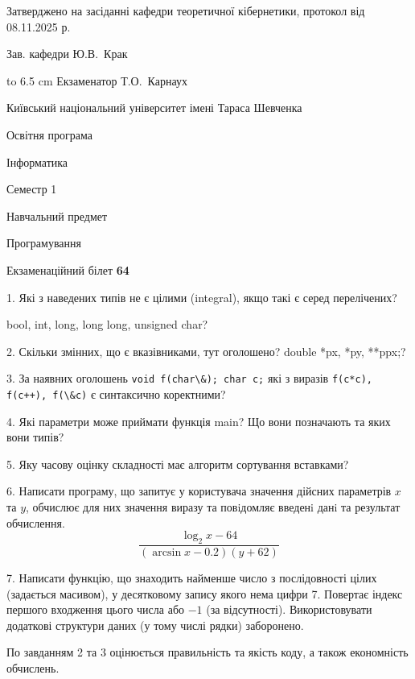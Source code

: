 \documentclass[12pt, ukrainian]{article}
\def\code#1{\Verb!#1!}
\begin{document}
{\smallskip\smallskip \begin {scriptsize} Затверджено на засіданні кафедри теоретичної кібернетики, протокол   від   08.11.2025 р.\par\smallskip\smallskip\smallskip\smallskip
{\parbox {6.5 cm} {Зав. кафедри \dotfill Ю.В.~Крак}}\hspace {0.7cm} {\hbox to 6.5 cm { Екзаменатор \dotfill Т.О.~Карнаух}} \end{scriptsize}}
\vspace{0.9cm}
{{\begin {scriptsize}\par
{ \center  Київський національний університет імені Тараса Шевченка \par}
{\parbox {5 cm}{Освітня програма \hfill}{\parbox {7 cm}{Інформатика\hfill}}\parbox {6 cm}{\hfill Семестр 1}}\par
{\parbox {5 cm} {Навчальний предмет \hfill}\parbox {7 cm}{Програмування \hfill}\parbox {6cm}{\hfill}\par}\vspace{-15pt} \end{scriptsize}}{\center Екзаменаційний білет \No \textbf { 64 }\par}}
{%
1. Які з наведених типів не є цілими (integral), якщо такі є серед перелічених?

bool, int, long, long long, unsigned char?
\par
\vspace{2mm}
2. Скільки змінних, що є вказівниками, тут оголошено?
double *px, *py, **ppx;?
\par
\vspace{2mm}
3. За наявних оголошень \code{void f(char\&); char c;} які з виразів \code{f(c*c), f(c++), f(\&c)} є синтаксично коректними?
\par
\vspace{2mm}
4. Які параметри може приймати функція main? Що вони позначають та яких вони типів?
\par
\vspace{2mm}
5. Яку часову оцінку складності має алгоритм сортування вставками?
\par
\vspace{2mm}
6. Написати програму, що запитує у користувача значення дійсних параметрів $x$ та $y$, обчислює для них значення виразу та повiдомляє введенi данi та результат обчислення.
$$\frac{\log_{2} x - 64}{(\arcsin x - 0.2) (y + 62)}$$ 

\par
7. Написати функцію, що знаходить найменше число з послідовності цілих (задається масивом), у десятковому запису якого нема цифри 7. Повертає індекс першого входження цього числа або $-1$ (за відсутності). Використовувати додаткові структури даних (у тому числі рядки) заборонено.

По завданням 2 та 3 оцінюється правильність та якість коду, а також економність обчислень.

}
\end{document}

